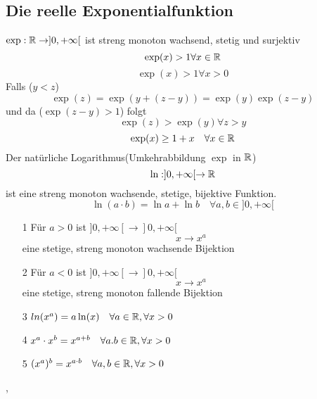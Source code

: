 \subsection{Die reelle Exponentialfunktion}
 \(\exp: \mathbb{R} \rightarrow ]0,+\infty[\) ist streng monoton wachsend, stetig und surjektiv
 \[ \exp(x) > 1 \forall x \in \mathbb{R} \]
\[\exp(x) > 1 \forall x > 0\] Falls (\(y < z\))
\[\exp(z) = \exp(y + ( z- y)) = \exp(y)\exp(z-y)\] und da (\(\exp(z-y) > 1\)) folgt
 \[\exp(z) > \exp(y) \forall z > y\]
 \[\exp(x) \geq 1 + x \quad \forall x \in \mathbb{R}\]
 Der natürliche Logarithmus(Umkehrabbildung \(\exp\) in \(\mathbb{R}\))
\[\ln : ]0,+\infty[ \rightarrow \mathbb{R} \] ist eine streng monoton wachsende, stetige, bijektive Funktion.
\[\ln(a \cdot b) = \ln a + \ln b \quad \forall a,b \in ]0,+\infty[\]
\begin{enumerate}
    \item [1] Für \(a > 0\) ist \(]0,+\infty[ \rightarrow ]0,+\infty[\)
    \[x \rightarrow x^a\] eine stetige, streng monoton wachsende Bijektion
    \item [2] Für \(a < 0\) ist \(]0,+\infty[ \rightarrow ]0,+\infty[\)
    \[x \rightarrow x^a\] eine stetige, streng monoton fallende Bijektion
    \item [3] \(ln(x^a) = a \ln(x) \quad \forall a \in \mathbb{R}, \forall x > 0\)
    \item [4] \(x^a \cdot x^b = x^{a+b} \quad \forall a.b \in \mathbb{R}, \forall x > 0\)
    \item [5] \((x^a)^b = x^{a \cdot b} \quad \forall a,b \in \mathbb{R}, \forall x > 0\)
\end{enumerate}
\sep
